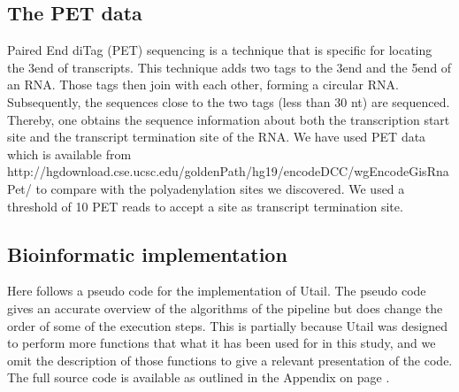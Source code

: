 \subsection{The PET data}
Paired End diTag (PET) sequencing is a technique that is specific for locating
the 3\ppp end of transcripts. This technique adds two tags to the 3\ppp end and
the 5\ppp end of an RNA. Those tags then join with each other, forming a
circular RNA. Subsequently, the sequences close to the two tags (less than 30
nt) are sequenced. Thereby, one obtains the sequence information about both the
transcription start site and the transcript termination site of the RNA. We
have used PET data which is available from
http://hgdownload.cse.ucsc.edu/goldenPath/hg19/encodeDCC/wgEncodeGisRnaPet/ to
compare with the polyadenylation sites we discovered. We used a threshold of 10
PET reads to accept a site as transcript termination site.

\subsection{Bioinformatic implementation}
Here follows a pseudo code for the implementation of Utail. The pseudo
code gives an accurate overview of the algorithms of the pipeline but does
change the order of some of the execution steps. This is partially because
Utail was designed to perform more functions that what it has been used for in
this study, and we omit the description of those functions to give a relevant
presentation of the code. The full source code is available as outlined in the
Appendix on page \pageref{source_code}.

\inputminted[fontsize=\small]{python}{pseudo_code/utail.py}


